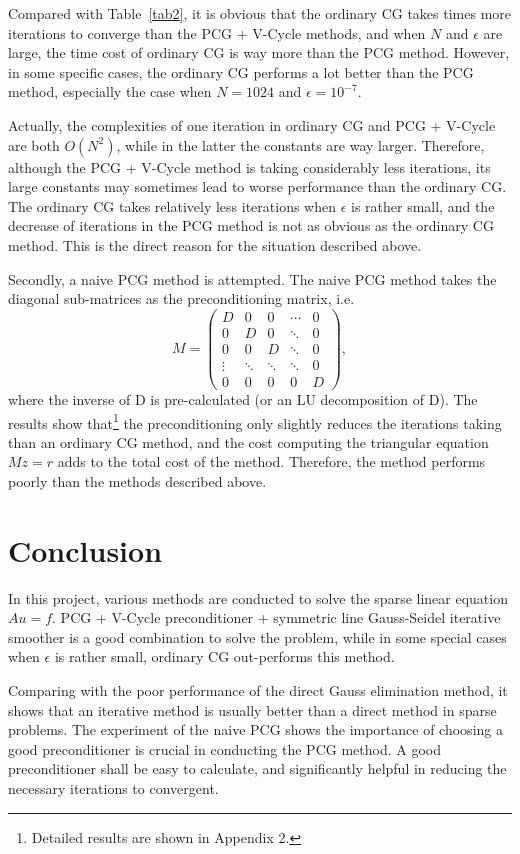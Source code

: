 \documentclass{article}
\begin{document}
Compared with Table~\ref{tab2}, it is obvious that the ordinary CG takes times more iterations to converge than the PCG + V-Cycle methods, and when $N$ and $\epsilon$ are large, the time cost of ordinary CG is way more than the PCG method. However, in some specific cases, the ordinary CG performs a lot better than the PCG method, especially the case when $N=1024$ and $\epsilon=10^{-7}$. 

Actually, the complexities of one iteration in ordinary CG and PCG + V-Cycle are both $O(N^2)$, while in the latter  the constants are way larger. Therefore, although the PCG + V-Cycle method is taking considerably less iterations, its large constants may sometimes lead to worse performance than the ordinary CG. The ordinary CG takes relatively less iterations when $\epsilon$ is rather small, and the decrease of iterations in the PCG method is not as obvious as the ordinary CG method. This is the direct reason for the situation described above.

Secondly, a naive PCG method is attempted. The naive PCG method takes the diagonal sub-matrices as the preconditioning matrix, i.e.
\begin{displaymath}
  M=
  \left(
    \begin{array}{ccccc}
      D & 0 & 0 & \cdots & 0 \\
      0 & D & 0 & \ddots & 0 \\
      0 & 0 & D & \ddots & 0 \\
      \vdots & \ddots & \ddots & \ddots & 0 \\
      0 & 0 & 0 & 0 & D
    \end{array}
  \right),
\end{displaymath}
where the inverse of D is pre-calculated (or an LU decomposition of D). The results show that\footnote{Detailed results are shown in Appendix 2. } the preconditioning only slightly reduces the iterations taking than an ordinary CG method, and the cost computing the triangular equation $Mz=r$ adds to the total cost of the method. Therefore, the method performs poorly than the methods described above.

\section{Conclusion}

In this project, various methods are conducted to solve the sparse linear equation $Au=f$. PCG + V-Cycle preconditioner + symmetric line Gauss-Seidel iterative smoother is a good combination to solve the problem, while in some special cases when $\epsilon$ is rather small, ordinary CG out-performs this method.

Comparing with the poor performance of the direct Gauss elimination method, it shows that an iterative method is usually better than a direct method in sparse problems. The experiment of the naive PCG shows the importance of choosing a good preconditioner is crucial in conducting the PCG method. A good preconditioner shall be easy to calculate, and significantly helpful in reducing the necessary iterations to convergent.
\end{document}
